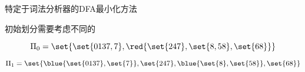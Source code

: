 \begin{frame}{}
  \begin{center}
    特定于词法分析器的DFA最小化方法


    \vspace{0.30cm}
    初始划分需要考虑不同的

    \vspace{-0.50cm}
    \[
      \Pi_{0} = \set{\set{0137, 7}, \red{\set{247}, \set{8, 58}, \set{68}}}
    \]

    \pause
    \vspace{-1.00cm}
    \[
      \Pi_{1} = \set{\blue{\set{0137}, \set{7}}, \set{247}, \blue{\set{8}, \set{58}}, 
        \set{68}}
    \]
  \end{center}
\end{frame}
